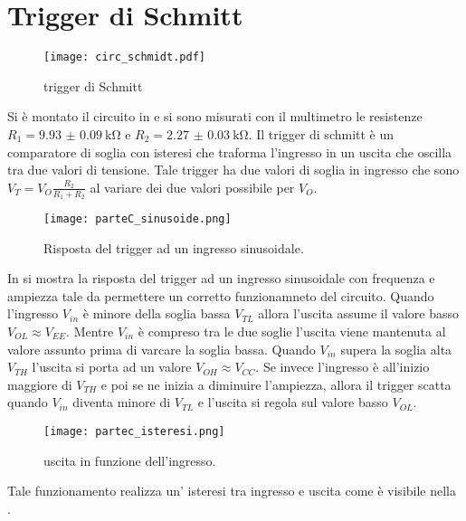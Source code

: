 \section{Trigger di Schmitt}

\begin{figure}[h]
	\centering
	\texttt{[image: circ\_schmidt.pdf]}
	\caption{trigger di Schmitt}
	\label{f:trigger}
\end{figure}

Si è montato il circuito in  e si sono misurati con il multimetro le resistenze $R_1= \SI{9.93(9)}{\kohm}$ e $R_2=\SI{2.27(3)}{\kohm}$. Il trigger di schmitt è un comparatore di soglia con isteresi che traforma l'ingresso in un uscita che oscilla tra due valori di tensione. Tale trigger ha due valori di soglia in ingresso che sono $V_{T}= V_{O}\frac{R_2}{R_1+R_2}$ al variare dei due valori possibile per $V_O$.
\begin{figure}[h]
	\centering
	\texttt{[image: parteC\_sinusoide.png]}
	\caption{Risposta del trigger ad un ingresso sinusoidale.}
	\label{f:sinusoide}
\end{figure}
In  si mostra la risposta del trigger ad un ingresso sinusoidale con frequenza e ampiezza tale da permettere un corretto funzionamneto del circuito.
Quando l'ingresso $V_{in}$ è minore della soglia bassa $V_{TL}$ allora l'uscita assume il valore basso $V_{OL} \approx V_{EE}$. Mentre $V_{in}$ è compreso tra le due soglie l'uscita viene mantenuta al valore assunto prima di varcare la soglia bassa. Quando $V_{in}$ supera la soglia alta $V_{TH}$ l'uscita si porta ad un valore $V_{OH} \approx V_{CC}$. 
Se invece l'ingresso è all'inizio maggiore di $V_{TH}$ e poi se ne inizia a diminuire l'ampiezza, allora il trigger scatta quando $V_{in}$ diventa minore di $V_{TL}$ e l'uscita si regola sul valore basso $V_{OL}$. 

\begin{figure}[h]
	\centering
	\texttt{[image: partec\_isteresi.png]}
	\caption{uscita in funzione dell'ingresso.}
	\label{f:isteresi}
\end{figure}
Tale funzionamento realizza un' isteresi tra ingresso e uscita come è visibile nella .

